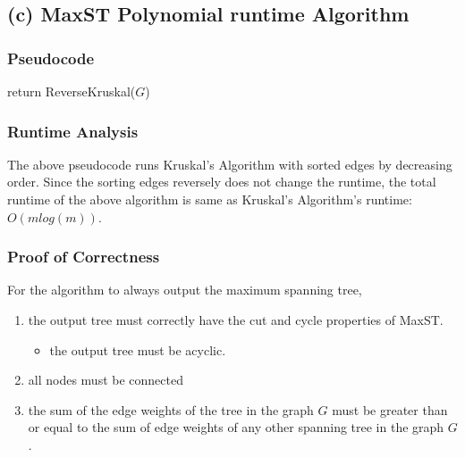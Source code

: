 \documentclass[11pt]{article}
\providecommand{\tightlist}{\setlength{\itemsep}{0pt}\setlength{\parskip}{0pt}}
\begin{document}
\hypertarget{c-maxst-polynomial-runtime-algorithm}{%
\subsection{(c) MaxST Polynomial runtime
Algorithm}\label{c-maxst-polynomial-runtime-algorithm}}

\hypertarget{pseudocode}{%
\subsubsection{Pseudocode}\label{pseudocode}}

\begin{algorithm}[H]
    \small
    \caption{MaxST($G$)}
    return ReverseKruskal($G$)\;
\end{algorithm}

\hypertarget{runtime-analysis}{%
\subsubsection{Runtime Analysis}\label{runtime-analysis}}

The above pseudocode runs Kruskal's Algorithm with sorted edges by
decreasing order. Since the sorting edges reversely does not change the
runtime, the total runtime of the above algorithm is same as Kruskal's
Algorithm's runtime: \(O(mlog(m))\).

\hypertarget{proof-of-correctness}{%
\subsubsection{Proof of Correctness}\label{proof-of-correctness}}

For the algorithm to always output the maximum spanning tree,

\begin{enumerate}
\def\labelenumi{\arabic{enumi}.}
\item
  the output tree must correctly have the cut and cycle properties of
  MaxST.

  \begin{itemize}
  \tightlist
  \item
    the output tree must be acyclic.
  \end{itemize}
\item
  all nodes must be connected
\item
  the sum of the edge weights of the tree in the graph \(G\) must be
  greater than or equal to the sum of edge weights of any other spanning
  tree in the graph \(G\).
\end{enumerate}
\end{document}
